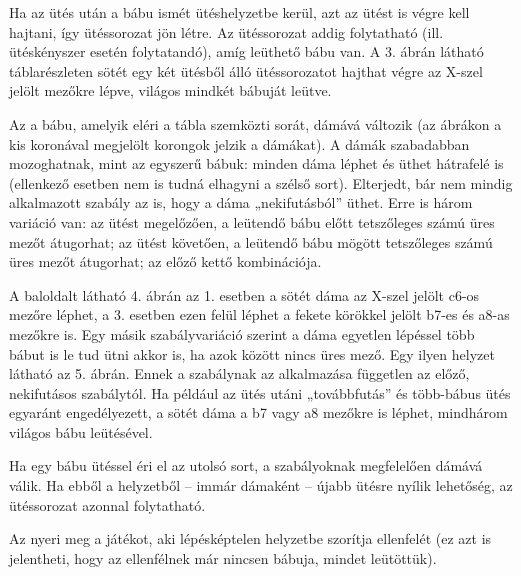 Ha az ütés után a bábu ismét ütéshelyzetbe kerül, azt az ütést is végre kell hajtani, így ütéssorozat jön létre. Az ütéssorozat addig folytatható (ill. ütéskényszer esetén folytatandó), amíg leüthető bábu van. A 3. ábrán látható táblarészleten sötét egy két ütésből álló ütéssorozatot hajthat végre az X-szel jelölt mezőkre lépve, világos mindkét bábuját leütve.

Az a bábu, amelyik eléri a tábla szemközti sorát, dámává változik (az ábrákon a kis koronával megjelölt korongok jelzik a dámákat). A dámák szabadabban mozoghatnak, mint az egyszerű bábuk: minden dáma léphet és üthet hátrafelé is (ellenkező esetben nem is tudná elhagyni a szélső sort).
Elterjedt, bár nem mindig alkalmazott szabály az is, hogy a dáma „nekifutásból” üthet. Erre is három variáció van:
az ütést megelőzően, a leütendő bábu előtt tetszőleges számú üres mezőt átugorhat;
az ütést követően, a leütendő bábu mögött tetszőleges számú üres mezőt átugorhat;
az előző kettő kombinációja.

A baloldalt látható 4. ábrán az 1. esetben a sötét dáma az X-szel jelölt c6-os mezőre léphet, a 3. esetben ezen felül léphet a fekete körökkel jelölt b7-es és a8-as mezőkre is.
Egy másik szabályvariáció szerint a dáma egyetlen lépéssel több bábut is le tud ütni akkor is, ha azok között nincs üres mező. Egy ilyen helyzet látható az 5. ábrán. Ennek a szabálynak az alkalmazása független az előző, nekifutásos szabálytól. Ha például az ütés utáni „továbbfutás” és több-bábus ütés egyaránt engedélyezett, a sötét dáma a b7 vagy a8 mezőkre is léphet, mindhárom világos bábu leütésével.

Ha egy bábu ütéssel éri el az utolsó sort, a szabályoknak megfelelően dámává válik. Ha ebből a helyzetből – immár dámaként – újabb ütésre nyílik lehetőség, az ütéssorozat azonnal folytatható.

Az nyeri meg a játékot, aki lépésképtelen helyzetbe szorítja ellenfelét (ez azt is jelentheti, hogy az ellenfélnek már nincsen bábuja, mindet leütöttük).


